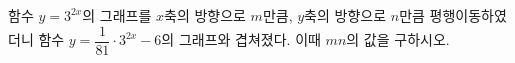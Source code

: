 함수 $y=3^{2x}$의 그래프를 $x$축의 방향으로 $m$만큼, $y$축의 방향으로 $n$만큼 평행이동하였더니 함수 $y=\dfrac{1}{81}\cdot 3^{2x}-6$의 그래프와 겹쳐졌다. 이때 $mn$의 값을 구하시오.
